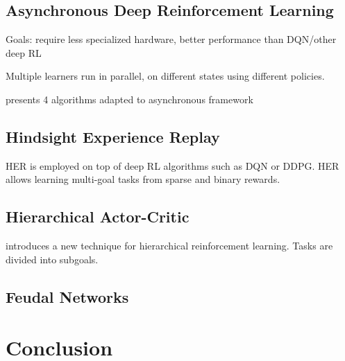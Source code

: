 \documentclass[runningheads]{llncs}
\begin{document}
\subsection{Asynchronous Deep Reinforcement Learning}

Goals: require less specialized hardware, better performance than DQN/other deep RL

Multiple learners run in parallel, on different states using different policies.

\cite{mnih2016asynchronous} presents 4 algorithms adapted to asynchronous framework

\subsection{Hindsight Experience Replay}

HER is employed on top of deep RL algorithms such as DQN or DDPG. HER allows learning multi-goal tasks from sparse and binary rewards.\cite{andrychowicz2017hindsight}

\subsection{Hierarchical Actor-Critic}

\cite{levy2017hierarchical} introduces a new technique for hierarchical reinforcement learning. Tasks are divided into subgoals.

\subsection{Feudal Networks}

\cite{vezhnevets2017feudal}

\section{Conclusion}

%
%
%
% 
% 
%



\end{document}
